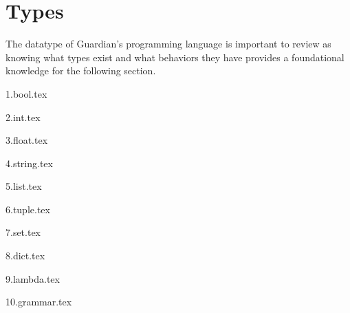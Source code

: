 
\section{Types}
{
	The datatype of Guardian's programming language is important to review
	as knowing what types exist
	and what behaviors they have provides a foundational knowledge for
	the following section.
	
	{1.bool.tex}
	
	{2.int.tex}
	
	{3.float.tex}
	
	{4.string.tex}
	
	{5.list.tex}
	
	{6.tuple.tex}
	
	{7.set.tex}
	
	{8.dict.tex}
	
	{9.lambda.tex}
	
	{10.grammar.tex}
}

